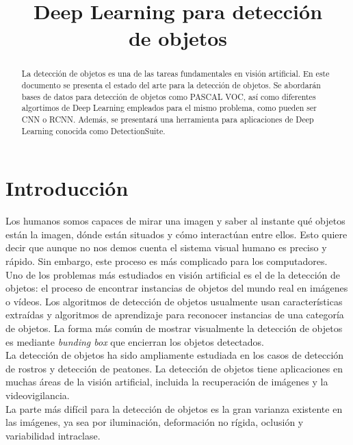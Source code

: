 \documentclass{bmvc2k}
\title{Deep Learning para detección\\ de objetos}
\begin{document}
\maketitle

\begin{abstract}
La detección de objetos es una de las tareas fundamentales en visión artificial. En este documento se presenta el estado del arte para la detección de objetos. Se abordarán bases de datos para detección de objetos como PASCAL VOC, así como diferentes algortimos de Deep Learning empleados para el mismo problema, como pueden ser CNN o RCNN. Además, se presentará una herramienta para aplicaciones de Deep Learning conocida como DetectionSuite.

\end{abstract}

\section{Introducción}
\label{sec:intro}
Los humanos somos capaces de mirar una imagen y saber al instante qué objetos están la imagen, dónde están situados y cómo interactúan entre ellos. Esto quiere decir que aunque no nos demos cuenta el sistema visual humano es preciso y rápido. Sin embargo, este proceso es más complicado para los computadores.\\

Uno de los problemas más estudiados en visión artificial es el de la detección de objetos: el proceso de encontrar instancias de objetos del mundo real en imágenes o vídeos. Los algoritmos de detección de objetos usualmente usan características extraídas y algoritmos de aprendizaje para reconocer instancias de una categoría de objetos. La forma más común de mostrar visualmente la detección de objetos es mediante \textit{bunding box} que encierran los objetos detectados.\\

La detección de objetos ha sido ampliamente estudiada en los casos de detección de rostros y detección de peatones. La detección de objetos tiene aplicaciones en muchas áreas de la visión artificial, incluida la recuperación de imágenes y la videovigilancia.\\

La parte más difícil para la detección de objetos es la gran varianza existente en las imágenes, ya sea por iluminación, deformación no rígida, oclusión y variabilidad intraclase.\\
\end{document}
